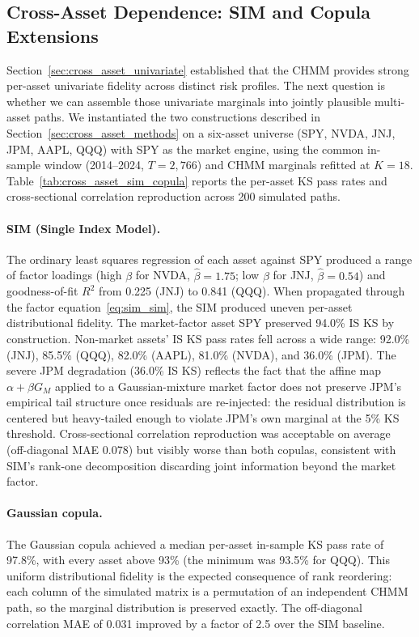\subsection{Cross-Asset Dependence: SIM and Copula Extensions}
\label{sec:cross_asset}

Section~\ref{sec:cross_asset_univariate} established that the CHMM provides strong per-asset univariate fidelity across distinct risk profiles.
The next question is whether we can assemble those univariate marginals into jointly plausible multi-asset paths.
We instantiated the two constructions described in Section~\ref{sec:cross_asset_methods} on a six-asset universe (SPY, NVDA, JNJ, JPM, AAPL, QQQ) with SPY as the market engine, using the common in-sample window (2014--2024, $T = 2{,}766$) and CHMM marginals refitted at $K = 18$.
Table~\ref{tab:cross_asset_sim_copula} reports the per-asset KS pass rates and cross-sectional correlation reproduction across 200 simulated paths.

\paragraph{SIM (Single Index Model).}
The ordinary least squares regression of each asset against SPY produced a range of factor loadings (high $\beta$ for NVDA, $\hat{\beta} = 1.75$; low $\beta$ for JNJ, $\hat{\beta} = 0.54$) and goodness-of-fit $R^2$ from 0.225 (JNJ) to 0.841 (QQQ).
When propagated through the factor equation~\eqref{eq:sim_sim}, the SIM produced uneven per-asset distributional fidelity.
The market-factor asset SPY preserved 94.0\% IS KS by construction.
Non-market assets' IS KS pass rates fell across a wide range: 92.0\% (JNJ), 85.5\% (QQQ), 82.0\% (AAPL), 81.0\% (NVDA), and 36.0\% (JPM).
The severe JPM degradation (36.0\% IS KS) reflects the fact that the affine map $\alpha + \beta G_M$ applied to a Gaussian-mixture market factor does not preserve JPM's empirical tail structure once residuals are re-injected: the residual distribution is centered but heavy-tailed enough to violate JPM's own marginal at the 5\% KS threshold.
Cross-sectional correlation reproduction was acceptable on average (off-diagonal MAE 0.078) but visibly worse than both copulas, consistent with SIM's rank-one decomposition discarding joint information beyond the market factor.

\paragraph{Gaussian copula.}
The Gaussian copula achieved a median per-asset in-sample KS pass rate of 97.8\%, with every asset above 93\% (the minimum was 93.5\% for QQQ).
This uniform distributional fidelity is the expected consequence of rank reordering: each column of the simulated matrix is a permutation of an independent CHMM path, so the marginal distribution is preserved exactly.
The off-diagonal correlation MAE of 0.031 improved by a factor of 2.5 over the SIM baseline.

